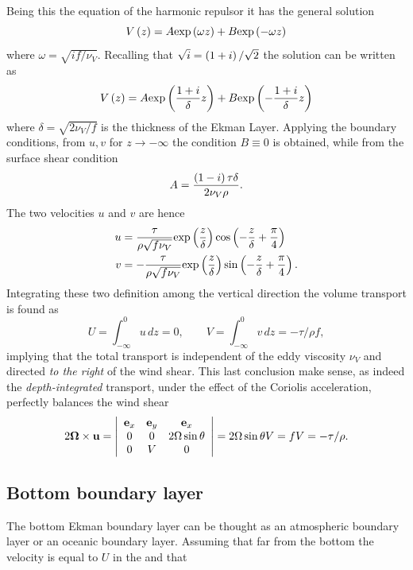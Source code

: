Being this the equation of the harmonic repulsor it has the general solution
\begin{equation*}
V\left( z \right)=A\text{exp}\left( \omega z \right)+B\text{exp}\left( -\omega z \right)
\end{equation*}
where $\omega=\sqrt{if/\nu_{V}}$. Recalling that $\sqrt{i}=\left( 1+i \right)/\sqrt{2}$ the solution can be written as
\begin{equation*}
V\left( z \right)=A\text{exp}\left( \dfrac{1+i}{\delta} z \right)+B\text{exp}\left( -\dfrac{1+i}{\delta} z \right)
\end{equation*}
where $\delta=\sqrt{2\nu_{V}/f}$ is the thickness of the Ekman Layer. Applying the boundary conditions, from $u,v$ for $z\rightarrow-\infty$ the condition $B\equiv 0$ is obtained, while from the surface shear condition 
\begin{equation*}
A=\dfrac{\left( 1-i \right)\tau\delta}{2\nu_{V}\rho}.
\end{equation*}
The two velocities $u$ and $v$ are hence
\begin{align*}
u&=\dfrac{\tau}{\rho\sqrt{f\nu_{V}}}\text{exp}\left( \dfrac{z}{\delta} \right)\cos\left( -\dfrac{z}{\delta}+\dfrac{\pi}{4} \right)\\
v&=-\dfrac{\tau}{\rho\sqrt{f\nu_{V}}}\text{exp}\left( \dfrac{z}{\delta} \right)\sin\left( -\dfrac{z}{\delta}+\dfrac{\pi}{4} \right).
\end{align*}
Integrating these two definition among the vertical direction the volume transport is found as
\begin{equation}
U=\int_{-\infty}^{0}u\,dz=0, \qquad V=\int_{-\infty}^{0}v\,dz=-\tau/\rho f,
\end{equation}
implying that the total transport is independent of the eddy viscosity $\nu_{V}$ and directed \textit{to the right} of the wind shear. This last conclusion make sense, as indeed the \textit{depth-integrated} transport, under the effect of the Coriolis acceleration, perfectly balances the wind shear
\begin{equation*}
2\boldsymbol{\Omega}\times\mathbf{u}=\left|\begin{array}{ccc}
\mathbf{e}_{x}&\mathbf{e}_{y}&\mathbf{e}_{x}\\
0&0&2\Omega\sin\theta\\
0&V&0
\end{array}\right|=
2\Omega\sin\theta V=fV=-\tau/\rho.
\end{equation*}
\subsection{Bottom boundary layer}
The bottom Ekman boundary layer can be thought as an atmospheric boundary layer or an oceanic boundary layer. Assuming that far from the bottom the velocity is equal to $U$ in the and that 
